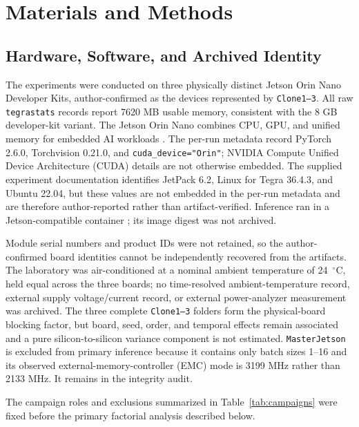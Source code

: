 \documentclass[electronics,article,submit,pdftex,moreauthors]{Definitions/mdpi}
\renewcommand{\tabref}[1]{Table~\ref{#1}}
\begin{document}
\section{Materials and Methods}

\subsection{Hardware, Software, and Archived Identity}

The experiments were conducted on three physically distinct Jetson Orin Nano Developer Kits, author-confirmed as the devices represented by \texttt{Clone1--3}. All raw \texttt{tegrastats} records report 7620 MB usable memory, consistent with the 8 GB developer-kit variant. The Jetson Orin Nano combines CPU, GPU, and unified memory for embedded AI workloads \cite{nvidiajetson}. The per-run metadata record PyTorch 2.6.0, Torchvision 0.21.0, and \texttt{cuda\_device="Orin"}; NVIDIA Compute Unified Device Architecture (CUDA) details are not otherwise embedded. The supplied experiment documentation identifies JetPack 6.2, Linux for Tegra 36.4.3, and Ubuntu 22.04, but these values are not embedded in the per-run metadata and are therefore author-reported rather than artifact-verified. Inference ran in a Jetson-compatible container \cite{paszke2019pytorch,jetsoncontainers}; its image digest was not archived.

Module serial numbers and product IDs were not retained, so the author-confirmed board identities cannot be independently recovered from the artifacts. The laboratory was air-conditioned at a nominal ambient temperature of 24~$^\circ$C, held equal across the three boards; no time-resolved ambient-temperature record, external supply voltage/current record, or external power-analyzer measurement was archived. The three complete \texttt{Clone1--3} folders form the physical-board blocking factor, but board, seed, order, and temporal effects remain associated and a pure silicon-to-silicon variance component is not estimated. \texttt{MasterJetson} is excluded from primary inference because it contains only batch sizes 1--16 and its observed external-memory-controller (EMC) mode is 3199 MHz rather than 2133 MHz. It remains in the integrity audit.

The campaign roles and exclusions summarized in \tabref{tab:campaigns} were fixed before the primary factorial analysis described below.
\end{document}
